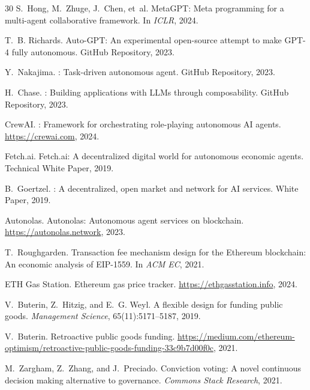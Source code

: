 \documentclass{article}
\begin{document}
\begin{thebibliography}{30}
S.~Hong, M.~Zhuge, J.~Chen, et~al.
\newblock Meta{GPT}: Meta programming for a multi-agent collaborative framework.
\newblock In \emph{ICLR}, 2024.

T.~B. Richards.
\newblock Auto-{GPT}: An experimental open-source attempt to make {GPT}-4 fully autonomous.
\newblock GitHub Repository, 2023.

Y.~Nakajima.
: Task-driven autonomous agent.
\newblock GitHub Repository, 2023.

H.~Chase.
: Building applications with {LLMs} through composability.
\newblock GitHub Repository, 2023.

CrewAI.
: Framework for orchestrating role-playing autonomous {AI} agents.
\newblock \url{https://crewai.com}, 2024.

Fetch.ai.
\newblock Fetch.ai: A decentralized digital world for autonomous economic agents.
\newblock Technical White Paper, 2019.

B.~Goertzel.
: A decentralized, open market and network for {AI} services.
\newblock White Paper, 2019.

Autonolas.
\newblock Autonolas: Autonomous agent services on blockchain.
\newblock \url{https://autonolas.network}, 2023.

T.~Roughgarden.
\newblock Transaction fee mechanism design for the {E}thereum blockchain: An economic analysis of {EIP}-1559.
\newblock In \emph{ACM EC}, 2021.

ETH Gas Station.
\newblock Ethereum gas price tracker.
\newblock \url{https://ethgasstation.info}, 2024.

V.~Buterin, Z.~Hitzig, and E.~G. Weyl.
\newblock A flexible design for funding public goods.
\newblock \emph{Management Science}, 65(11):5171--5187, 2019.

V.~Buterin.
\newblock Retroactive public goods funding.
\newblock \url{https://medium.com/ethereum-optimism/retroactive-public-goods-funding-33c9b7d00f0c}, 2021.

M.~Zargham, Z.~Zhang, and J.~Preciado.
\newblock Conviction voting: A novel continuous decision making alternative to governance.
\newblock \emph{Commons Stack Research}, 2021.


\end{thebibliography}
\end{document}
